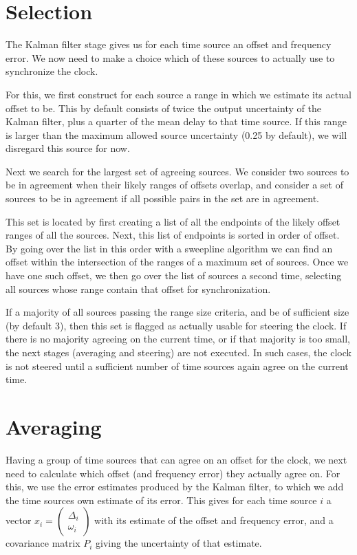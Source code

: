 \documentclass{article}
\begin{document}
\section{Selection}\label{sec:selection}

The Kalman filter stage gives us for each time source an offset and frequency error.
We now need to make a choice which of these sources to actually use to synchronize the clock.

For this, we first construct for each source a range in which we estimate its actual offset to be.
This by default consists of twice the output uncertainty of the Kalman filter, plus a quarter of the mean delay to that time source.
If this range is larger than the maximum allowed source uncertainty (0.25 by default), we will disregard this source for now.

Next we search for the largest set of agreeing sources. We consider two sources to be in agreement when their likely ranges of offsets overlap,
and consider a set of sources to be in agreement if all possible pairs in the set are in agreement.

This set is located by first creating a list of all the endpoints of the likely offset ranges of all the sources.
Next, this list of endpoints is sorted in order of offset.
By going over the list in this order with a sweepline algorithm we can find an offset within the intersection of the ranges of a maximum set of sources.
Once we have one such offset, we then go over the list of sources a second time, selecting all sources whose range contain that offset for synchronization.

If a majority of all sources passing the range size criteria, and be of sufficient size (by default 3), then this set is flagged as actually usable for
steering the clock.
If there is no majority agreeing on the current time, or if that majority is too small, the next stages (averaging and steering) are not executed.
In such cases, the clock is not steered until a sufficient number of time sources again agree on the current time.

\section{Averaging}\label{sec:averaging}

Having a group of time sources that can agree on an offset for the clock, we next need to calculate which offset (and frequency error) they actually agree on.
For this, we use the error estimates produced by the Kalman filter, to which we add the time sources own estimate of its error.
This gives for each time source $i$ a vector $x_i = \begin{pmatrix}\Delta_i\\\omega_i\end{pmatrix}$ with its estimate of the offset and frequency error,
and a covariance matrix $P_i$ giving the uncertainty of that estimate.
\end{document}
